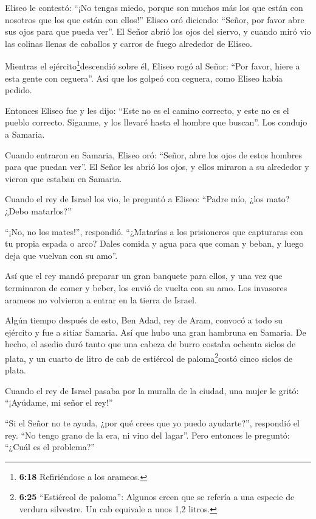  Eliseo le contestó: ``¡No tengas miedo, porque son muchos
más los que están con nosotros que los que están con ellos!''
 Eliseo oró diciendo: ``Señor, por favor abre sus ojos para
que pueda ver''. El Señor abrió los ojos del siervo, y cuando miró vio
las colinas llenas de caballos y carros de fuego alrededor de Eliseo.

 Mientras el ejército\footnote{\textbf{6:18} Refiriéndose a
  los arameos.}descendió sobre él, Eliseo rogó al Señor: ``Por favor,
hiere a esta gente con ceguera''. Así que los golpeó con ceguera, como
Eliseo había pedido.

 Entonces Eliseo fue y les dijo: ``Este no es el camino
correcto, y este no es el pueblo correcto. Síganme, y los llevaré hasta
el hombre que buscan''. Los condujo a Samaria.

 Cuando entraron en Samaria, Eliseo oró: ``Señor, abre los
ojos de estos hombres para que puedan ver''. El Señor les abrió los
ojos, y ellos miraron a su alrededor y vieron que estaban en Samaria.

 Cuando el rey de Israel los vio, le preguntó a Eliseo:
``Padre mío, ¿los mato? ¿Debo matarlos?''

 ``¡No, no los mates!'', respondió. ``¿Matarías a los
prisioneros que capturaras con tu propia espada o arco? Dales comida y
agua para que coman y beban, y luego deja que vuelvan con su amo''.

 Así que el rey mandó preparar un gran banquete para ellos,
y una vez que terminaron de comer y beber, los envió de vuelta con su
amo. Los invasores arameos no volvieron a entrar en la tierra de Israel.

 Algún tiempo después de esto, Ben Adad, rey de Aram,
convocó a todo su ejército y fue a sitiar Samaria.  Así que
hubo una gran hambruna en Samaria. De hecho, el asedio duró tanto que
una cabeza de burro costaba ochenta siclos de plata, y un cuarto de
litro de cab de estiércol de paloma\footnote{\textbf{6:25} ``Estiércol
  de paloma'': Algunos creen que se refería a una especie de verdura
  silvestre. Un cab equivale a unos 1,2 litros.}costó cinco siclos de
plata.

 Cuando el rey de Israel pasaba por la muralla de la
ciudad, una mujer le gritó: ``¡Ayúdame, mi señor el rey!''

 ``Si el Señor no te ayuda, ¿por qué crees que yo puedo
ayudarte?'', respondió el rey. ``No tengo grano de la era, ni vino del
lagar''.  Pero entonces le preguntó: ``¿Cuál es el
problema?''

